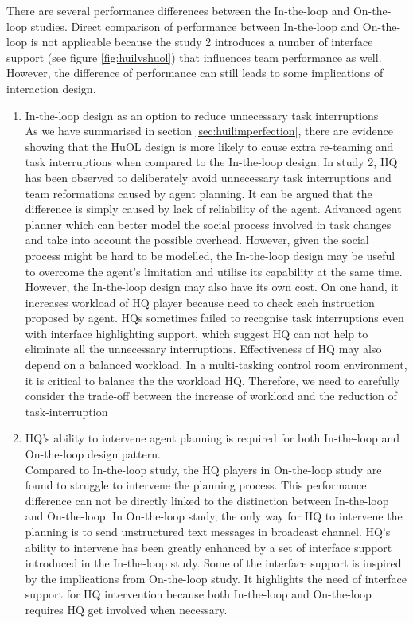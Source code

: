 There are several performance differences between the In-the-loop and On-the-loop studies. Direct comparison of performance between In-the-loop and On-the-loop is not applicable because the study 2 introduces a number of interface support (see figure \ref{fig:huilvshuol}) that influences team performance as well. However, the difference of performance can still leads to some implications of interaction design.\\

\begin{enumerate}
\item In-the-loop design as an option to reduce unnecessary task interruptions \\
As we have summarised in section \ref{sec:huilimperfection}, there are evidence showing that the HuOL design is more likely to cause extra re-teaming and task interruptions when compared to the In-the-loop design. In study 2, HQ has been observed to deliberately avoid unnecessary task interruptions and team reformations caused by agent planning. It can be argued that the difference is simply caused by lack of reliability of the agent. Advanced agent planner which can better model the social process involved in task changes and take into account the possible overhead. However, given the social process might be hard to be modelled, the In-the-loop design may be useful to overcome the agent's limitation and utilise its capability at the same time.  \\

However, the In-the-loop design may also have its own cost. On one hand, it increases workload of HQ player because need to check each instruction proposed by agent. HQs sometimes failed to recognise task interruptions even with interface highlighting support, which suggest HQ can not help to eliminate all the unnecessary interruptions. Effectiveness of HQ may also depend on a balanced workload. In a multi-tasking control room environment, it is critical to balance the the workload HQ. Therefore, we need to carefully consider the trade-off between the increase of workload and the reduction of task-interruption \\

\item HQ's ability to intervene agent planning is required for both In-the-loop and On-the-loop design pattern.\\
Compared to In-the-loop study, the HQ players in On-the-loop study are found to struggle to intervene the planning process. This performance difference can not be directly linked to the distinction between In-the-loop and On-the-loop. In On-the-loop study, the only way for HQ to intervene the planning is to send unstructured text messages in broadcast channel. HQ's ability to intervene has been greatly enhanced by a set of interface support introduced in the In-the-loop study. Some of the interface support is inspired by the implications from On-the-loop study. It highlights the need of interface support for HQ intervention because both In-the-loop and On-the-loop requires HQ get involved when necessary. \\


\end{enumerate}
